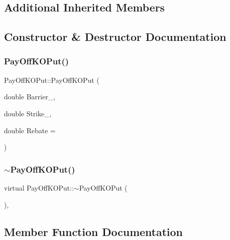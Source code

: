 \subsection*{Additional Inherited Members}


\subsection{Constructor \& Destructor Documentation}
\hypertarget{classPayOffKOPut_afd98032ab799b0c9748220c488dd3ee2}{}\label{classPayOffKOPut_afd98032ab799b0c9748220c488dd3ee2} 
\subsubsection{\texorpdfstring{Pay\+Off\+K\+O\+Put()}{PayOffKOPut()}}
{\footnotesize\ttfamily Pay\+Off\+K\+O\+Put\+::\+Pay\+Off\+K\+O\+Put (\begin{DoxyParamCaption}\item[{double}]{Barrier\+\_\+,  }\item[{double}]{Strike\+\_\+,  }\item[{double}]{Rebate = {} }\end{DoxyParamCaption})}

\hypertarget{classPayOffKOPut_a108561d7440c3af8677fd78e0254dea6}{}\label{classPayOffKOPut_a108561d7440c3af8677fd78e0254dea6} 
\subsubsection{\texorpdfstring{$\sim$\+Pay\+Off\+K\+O\+Put()}{~PayOffKOPut()}}
{\footnotesize\ttfamily virtual Pay\+Off\+K\+O\+Put\+::$\sim$\+Pay\+Off\+K\+O\+Put (\begin{DoxyParamCaption}{ }\end{DoxyParamCaption})\hspace{0.3cm}{\ttfamily [inline]}, {\ttfamily [virtual]}}



\subsection{Member Function Documentation}
\hypertarget{classPayOffKOPut_a5d1bfbac10d0d7d061d8c629042d2a58}{}\label{classPayOffKOPut_a5d1bfbac10d0d7d061d8c629042d2a58} 
